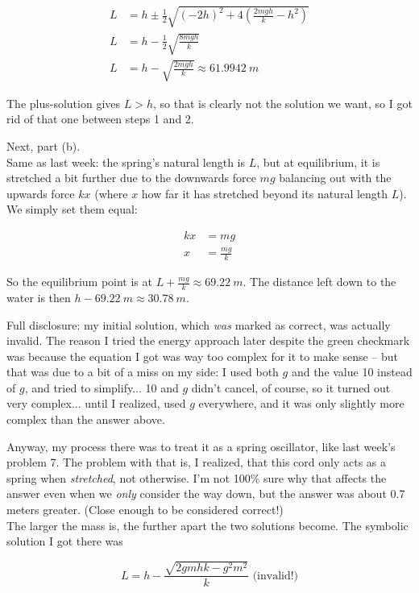 \documentclass[8.01x]{subfiles}
\begin{document}
\begin{align}
L &= h \pm \frac{1}{2} \sqrt{(-2h)^2 + 4\left(\frac{2 m g h}{k} - h^2\right)}\\
L &= h - \frac{1}{2} \sqrt{\frac{8 m g h}{k}}\\
L &= h - \sqrt{\frac{2 m g h}{k}} \approx \SI{61.9942}{m}
\end{align}

The plus-solution gives $L > h$, so that is clearly not the solution we want, so I got rid of that one between steps 1 and 2.

Next, part (b).\\
Same as last week: the spring's natural length is $L$, but at equilibrium, it is stretched a bit further due to the downwards force $m g$ balancing out with the upwards force $k x$ (where $x$ how far it has stretched beyond its natural length $L$). We simply set them equal:

\begin{align}
k x &= m g\\
x   &= \frac{m g}{k}
\end{align}

So the equilibrium point is at $L + \frac{m g}{k} \approx \SI{69.22}{m}$. The distance left down to the water is then $h - \SI{69.22}{m} \approx \SI{30.78}{m}$.

Full disclosure: my initial solution, which \emph{was} marked as correct, was actually invalid. The reason I tried the energy approach later despite the green checkmark was because the equation I got was way too complex for it to make sense -- but that was due to a bit of a miss on my side: I used both $g$ and the value 10 instead of $g$, and tried to simplify... 10 and $g$ didn't cancel, of course, so it turned out very complex... until I realized, used $g$ everywhere, and it was only slightly more complex than the answer above.

Anyway, my process there was to treat it as a spring oscillator, like last week's problem 7. The problem with that is, I realized, that this cord only acts as a spring when \emph{stretched}, not otherwise. I'm not 100\% sure why that affects the answer even when we \emph{only} consider the way down, but the answer was about 0.7 meters greater. (Close enough to be considered correct!)\\
The larger the mass is, the further apart the two solutions become. The symbolic solution I got there was

\begin{equation}
L = h - \frac{\sqrt{2 g m h k - g^2 m^2}}{k} \text{ (invalid!)}
\end{equation}
\end{document}
